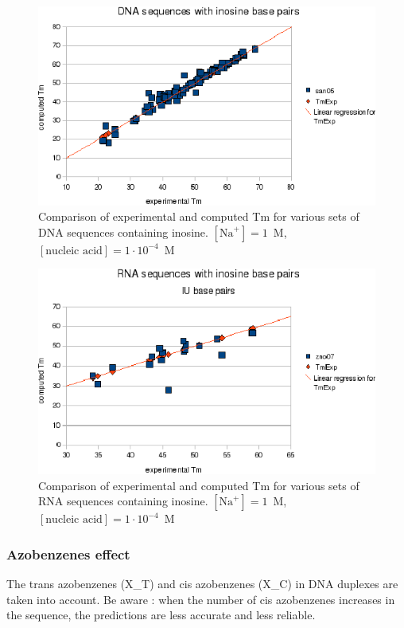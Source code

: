 \documentclass{article}
\begin{document}
\begin{figure}[h]
\includegraphics[width=1\linewidth]{images/DNAInosine}
\caption{Comparison of experimental and computed Tm for various sets of
 DNA sequences containing inosine. $[\mbox{Na}^+] = 1$~M, $[\mbox{nucleic acid}] = 1\cdot{}10^{-4}$~M}
\end{figure}

\begin{figure}[h]
\includegraphics[width=1\linewidth]{images/RNAInosine}
\caption{Comparison of experimental and computed Tm for various sets of
 RNA sequences containing inosine. $[\mbox{Na}^+] = 1$~M, $[\mbox{nucleic acid}] = 1\cdot{}10^{-4}$~M}
\end{figure}

\clearpage
\subsubsection{Azobenzenes effect}

The trans azobenzenes (X\_T) and cis azobenzenes (X\_C) in DNA duplexes are taken 
into account. Be aware : when the number of cis azobenzenes increases in the sequence, 
the predictions are less accurate and less reliable.
\end{document}
